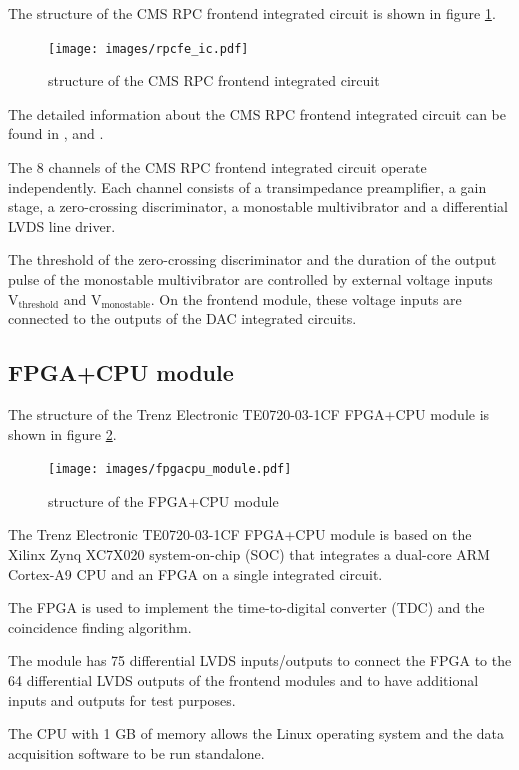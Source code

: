\documentclass[12pt, a4paper]{article}
\begin{document}
The structure of the CMS RPC frontend integrated circuit is shown in figure \ref{fig:rpcfe_ic}.

\begin{figure}[h!]
  \centering
  \texttt{[image: images/rpcfe\_ic.pdf]}
  \caption{structure of the CMS RPC frontend integrated circuit}
  \label{fig:rpcfe_ic}
\end{figure}

The detailed information about the CMS RPC frontend integrated circuit can be found in \cite{rpcnim2000}, \cite{lhcb2002} and \cite{rpcreview2000}.

The 8 channels of the CMS RPC frontend integrated circuit operate independently. Each channel consists of a transimpedance preamplifier, a gain stage, a zero-crossing discriminator, a monostable multivibrator and a differential LVDS line driver.

The threshold of the zero-crossing discriminator and the duration of the output pulse of the monostable multivibrator are controlled by external voltage inputs $\text{V}_\text{threshold}$ and $\text{V}_\text{monostable}$. On the frontend module, these voltage inputs are connected to the outputs of the DAC integrated circuits.

\subsection{FPGA+CPU module}

The structure of the Trenz Electronic TE0720-03-1CF FPGA+CPU module is shown in figure \ref{fig:fpgacpu_module}.

\begin{figure}[h!]
  \centering
  \texttt{[image: images/fpgacpu\_module.pdf]}
  \caption{structure of the FPGA+CPU module}
  \label{fig:fpgacpu_module}
\end{figure}

The Trenz Electronic TE0720-03-1CF FPGA+CPU module is based on the Xilinx Zynq XC7X020 system-on-chip (SOC) that integrates a dual-core ARM Cortex-A9 CPU and an FPGA on a single integrated circuit.

The FPGA is used to implement the time-to-digital converter (TDC) and the coincidence finding algorithm.

The module has 75 differential LVDS inputs/outputs to connect the FPGA to the 64 differential LVDS outputs of the frontend modules and to have additional inputs and outputs for test purposes.

The CPU with 1 GB of memory allows the Linux operating system and the data acquisition software to be run standalone.
\end{document}
